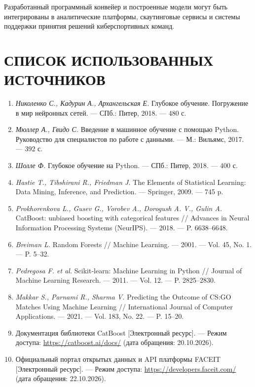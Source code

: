 \documentclass[14pt, a4paper]{extarticle}
\begin{document}
Разработанный программный конвейер и построенные модели могут быть интегрированы в аналитические платформы, скаутинговые сервисы и системы поддержки принятия решений киберспортивных команд.

\newpage

\section*{СПИСОК ИСПОЛЬЗОВАННЫХ ИСТОЧНИКОВ}

\begin{enumerate}
    \item \textit{Николенко С., Кадурин А., Архангельская Е.} Глубокое обучение. Погружение в мир нейронных сетей. --- СПб.: Питер, 2018. --- 480 с.
    \item \textit{Мюллер А., Гвидо С.} Введение в машинное обучение с помощью Python. Руководство для специалистов по работе с данными. --- М.: Вильямс, 2017. --- 392 с.
    \item \textit{Шолле Ф.} Глубокое обучение на Python. --- СПб.: Питер, 2018. --- 400 с.
    \item \textit{Hastie T., Tibshirani R., Friedman J.} The Elements of Statistical Learning: Data Mining, Inference, and Prediction. --- Springer, 2009. --- 745 p.
    \item \textit{Prokhorenkova L., Gusev G., Vorobev A., Dorogush A. V., Gulin A.} CatBoost: unbiased boosting with categorical features // Advances in Neural Information Processing Systems (NeurIPS). --- 2018. --- P. 6638--6648.
    \item \textit{Breiman L.} Random Forests // Machine Learning. --- 2001. --- Vol. 45, No. 1. --- P. 5--32.
    \item \textit{Pedregosa F. et al.} Scikit-learn: Machine Learning in Python // Journal of Machine Learning Research. --- 2011. --- Vol. 12. --- P. 2825--2830.
    \item \textit{Makkar S., Parnami R., Sharma V.} Predicting the Outcome of CS:GO Matches Using Machine Learning // International Journal of Computer Applications. --- 2021. --- Vol. 183, No. 22. --- P. 15--20.
    \item Документация библиотеки CatBoost [Электронный ресурс]. --- Режим доступа: \url{https://catboost.ai/docs/} (дата обращения: 20.10.2026).
    \item Официальный портал открытых данных и API платформы FACEIT [Электронный ресурс]. --- Режим доступа: \url{https://developers.faceit.com/} (дата обращения: 22.10.2026).
\end{enumerate}
\end{document}
